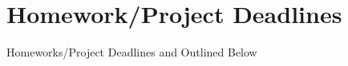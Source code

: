 \documentclass[11pt]{article}
\begin{document}



\section{Homework/Project Deadlines}
Homeworks/Project Deadlines and Outlined Below
\end{document}
